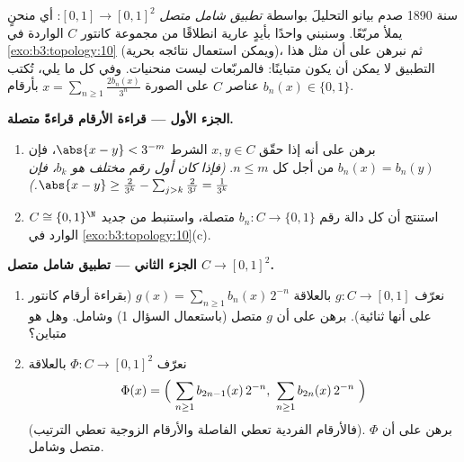 \begin{problem}\label{pb:b3:topology:1}
سنة 1890 صدم بيانو التحليلَ بواسطة \emph{تطبيق شامل متصل} $[0,1] \to [0,1]^2$:
أي منحنٍ يملأ مربّعًا. وسنبني واحدًا بأيدٍ عارية انطلاقًا من
مجموعة كانتور $C$ الواردة في \cref{exo:b3:topology:10} (ويمكن استعمال نتائجه
بحرية)، ثم نبرهن على أن مثل هذا التطبيق لا يمكن أن يكون
متباينًا: فالمربّعات ليست منحنيات. وفي كل ما يلي، تُكتب عناصر
$C$ على الصورة $x =
\sum_{n \geq 1} \frac{2b_n(x)}{3^n}$ بأرقام $b_n(x) \in
\{0, 1\}$.

\medskip
\noindent\textbf{الجزء الأول --- قراءة الأرقام قراءةً متصلة.}
\begin{enumerate}
  \item برهن على أنه إذا حقّق $x, y \in C$ الشرط $\abs{x - y} <
        3^{-m}$، فإن
        $b_n(x) = b_n(y)$ من أجل كل $n \leq m$. \emph{(فإذا كان أول رقم
        مختلف هو $b_k$، فإن $\abs{x - y} \geq \frac{2}{3^k} - \sum_{j>k}\frac2{3^j}
        = \frac1{3^k}$.)}
  \item استنتج أن كل دالة رقم $b_n \colon C \to \{0,
        1\}$ متصلة، واستنبط من جديد
         $C
        \cong \{0,1\}^\N$ الوارد في \cref{exo:b3:topology:10}(c).
\end{enumerate}

\medskip
\noindent\textbf{الجزء الثاني --- تطبيق شامل متصل $C \to
[0,1]^2$.}
\begin{enumerate}[resume]
  \item نعرّف $g \colon C \to [0,1]$ بالعلاقة $g(x) = \sum_{n\geq1}
        b_n(x)\,2^{-n}$ (بقراءة أرقام كانتور على
        أنها ثنائية). برهن على أن $g$ متصل (باستعمال السؤال 1)
        وشامل. وهل هو متباين؟
  \item نعرّف $\Phi \colon C \to [0,1]^2$ بالعلاقة
        \[
        \Phi(x) = \Bigl(\ \sum_{n\geq1} b_{2n-1}(x)\,2^{-n},\
        \sum_{n\geq1} b_{2n}(x)\,2^{-n}\ \Bigr)
        \]
        (فالأرقام الفردية تعطي الفاصلة والأرقام الزوجية تعطي
        الترتيب). برهن على أن $\Phi$ متصل وشامل.
\end{enumerate}


\end{problem}
